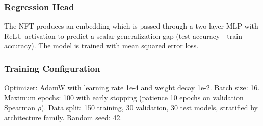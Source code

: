 \subsubsection{Regression Head}

The NFT produces an embedding which is passed through a two-layer MLP with ReLU activation to predict a scalar generalization gap (test accuracy - train accuracy). The model is trained with mean squared error loss.

\subsubsection{Training Configuration}

Optimizer: AdamW with learning rate 1e-4 and weight decay 1e-2. Batch size: 16. Maximum epochs: 100 with early stopping (patience 10 epochs on validation Spearman $\rho$). Data split: 150 training, 30 validation, 30 test models, stratified by architecture family. Random seed: 42.

